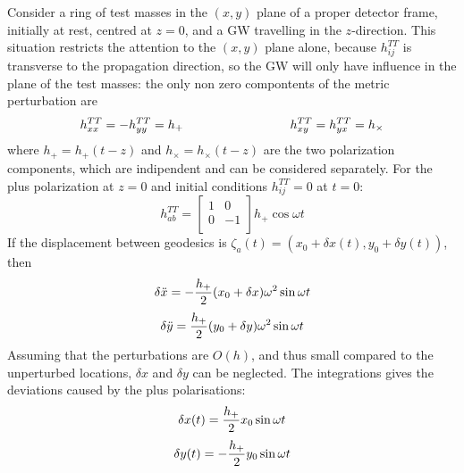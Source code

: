 \documentclass[binding=0.6cm, LaM]{sapthesis}
\begin{document}
        Consider a ring of test masses in the $(x, y)$ plane of a proper detector frame, initially at rest, centred at $z = 0$,
        and a GW travelling in the $z$-direction.
        This situation restricts the attention to the $(x,y)$ plane alone, because $h_{ij}^{TT}$ is transverse to the propagation direction,
        so the GW will only have influence in the plane of the test masses:
        the only non zero compontents of the metric perturbation are
                \begin{equation}
                	h_{xx}^{TT} = - h_{yy}^{TT} = h_{+} \hspace*{3cm} h_{xy}^{TT} = h_{yx}^{TT} = h_{\times}
                \end{equation}
        where $h_{+}=h_{+}(t-z)$ and $h_{\times}=h_{\times}(t-z)$ are the two polarization components, which are indipendent and can be considered separately.
        For the plus polarization at $z=0$ and initial conditions $h_{ij}^{TT} = 0$ at $t=0$:
                \begin{equation}
                h_{ab}^{TT} = 
                \begin{bmatrix}
                1  & 0 \\
                0 &  -1 \\
                \end{bmatrix} 
                h_{+}\cos \omega t
                \end{equation}
        If the displacement between geodesics is $\zeta_a (t) = (x_0 + \delta x(t), y_0 + \delta y(t))$, then
                \begin{equation}
                	\delta {\ddot x} = - {{h_{+}} \over 2} (x_0 + \delta x) \omega ^2 \sin \omega t
                \end{equation}
                \begin{equation}
                	\delta {\ddot y} =  {{h_{+}} \over 2} (y_0 + \delta y) \omega ^2 \sin \omega t
                \end{equation}
        Assuming that the perturbations are $O(h)$, and thus small compared to the unperturbed locations, $\delta x$ and $\delta y$ can be neglected.
        The integrations gives the deviations caused by the plus polarisations:
                \begin{equation}
                	\delta x(t) =  {{h_{+}} \over 2} x_0 \sin \omega t
                \end{equation}
                \begin{equation}
                	\delta y(t) = - {{h_{+}} \over 2} y_0  \sin \omega t
                \end{equation}
\end{document}
